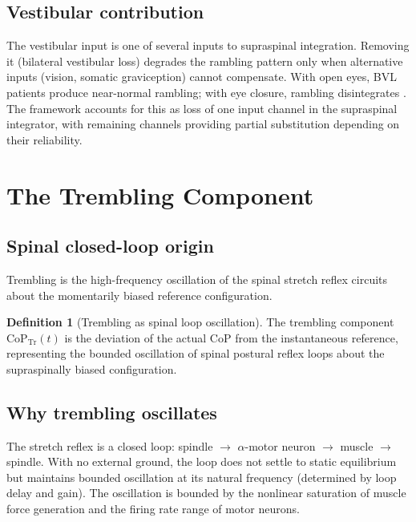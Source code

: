 \documentclass[11pt,twocolumn,a4paper]{article}
\theoremstyle{definition}
\newtheorem{definition}[theorem]{Definition}
\theoremstyle{remark}
\newcommand{\Tr}{\mathrm{Tr}}
\begin{document}
\subsection{Vestibular contribution}

The vestibular input is one of several inputs to supraspinal
integration. Removing it (bilateral vestibular loss) degrades the
rambling pattern only when alternative inputs (vision, somatic
graviception) cannot compensate. With open eyes, BVL patients
produce near-normal rambling; with eye closure, rambling
disintegrates \citep{horak2006}. The framework accounts for this
as loss of one input channel in the supraspinal integrator, with
remaining channels providing partial substitution depending on
their reliability.


\section{The Trembling Component}
\label{sec:trembling}

\subsection{Spinal closed-loop origin}

Trembling is the high-frequency oscillation of the spinal stretch
reflex circuits about the momentarily biased reference
configuration.

\begin{definition}[Trembling as spinal loop oscillation]
\label{def:trembling}
The trembling component $\mathrm{CoP}_{\Tr}(t)$ is the deviation
of the actual CoP from the instantaneous reference, representing
the bounded oscillation of spinal postural reflex loops about the
supraspinally biased configuration.
\end{definition}

\subsection{Why trembling oscillates}

The stretch reflex is a closed loop: spindle $\to$ $\alpha$-motor
neuron $\to$ muscle $\to$ spindle. With no external ground, the
loop does not settle to static equilibrium but maintains bounded
oscillation at its natural frequency (determined by loop delay and
gain). The oscillation is bounded by the nonlinear saturation of
muscle force generation and the firing rate range of motor
neurons.
\end{document}
